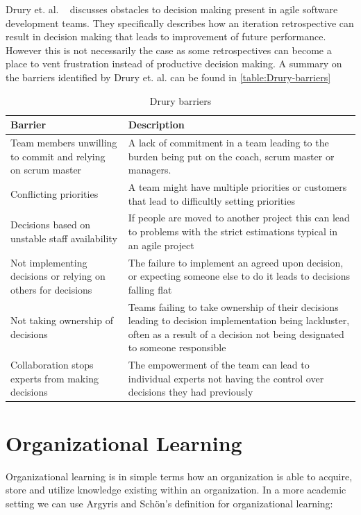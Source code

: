 Drury et. al. ~\cite{Drury2012} discusses obstacles to decision making present in agile software development teams. They specifically describes how an iteration retrospective can result in decision making that leads to improvement of future performance. However this is not necessarily the case as some retrospectives can become a place to vent frustration instead of productive decision making. A summary on the barriers identified by Drury et. al. can be found in \autoref{table:Drury-barriers}

\begin{table}[h]
	\begin{center}
		\caption{Drury barriers}
		\label{table:Drury-barriers}
		\begin{tabular}{ p{} | p{}}
			\hline
			Barrier & Description \\
			\hline
			Team members unwilling to commit and relying on scrum master & A lack of commitment in a team leading to the burden being put on the coach, scrum master or managers. \\
			Conflicting priorities & A team might have multiple priorities or customers that lead to difficultly setting priorities \\
			Decisions based on unstable staff availability & If people are moved to another project this can lead to problems with the strict estimations typical in an agile project \\
			Not implementing decisions or relying on others for decisions & The failure to implement an agreed upon decision, or expecting someone else to do it leads to decisions falling flat \\
			Not taking ownership of decisions & Teams failing to take ownership of their decisions leading to decision implementation being lackluster, often as a result of a decision not being designated to someone responsible\\
			Collaboration stops experts from making decisions & The empowerment of the team can lead to individual experts not having the control over decisions they had previously \\
			\hline
		\end{tabular}
	\end{center}
\end{table}

\clearpage

\section{Organizational Learning}
\label{intro:organizational-learning}
Organizational learning is in simple terms how an organization is able to acquire, store and utilize knowledge existing within an organization. In a more academic setting we can use Argyris and Schön's definition \cite{Argyris1996} for organizational learning: 

